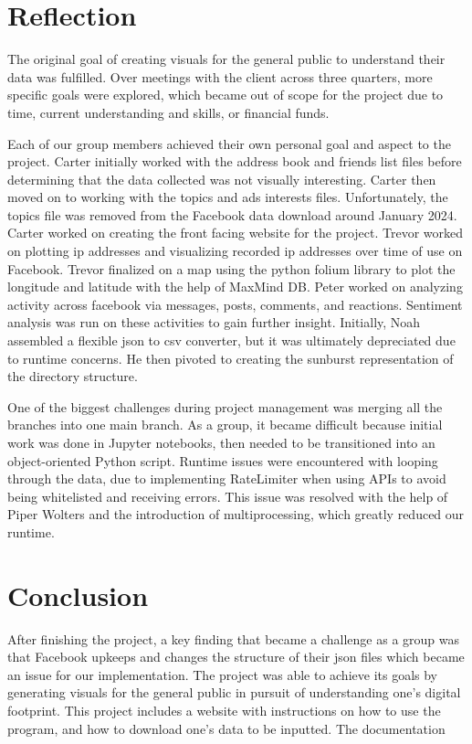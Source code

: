 \documentclass[conference, letterpaper, 11pt]{IEEEtran}
\begin{document}
\section{Reflection} \label{RE}
The original goal of creating visuals for the general public to understand their data was fulfilled. Over meetings with the client across three quarters, more specific goals were explored, which became out of scope for the project due to time, current understanding and skills, or financial funds.

Each of our group members achieved their own personal goal and aspect to the project. Carter initially worked with the address book and friends list files before determining that the data collected was not visually interesting. Carter then moved on to working with the topics and ads interests files. Unfortunately, the topics file was removed from the Facebook data download around January 2024. Carter worked on creating the front facing website for the project. Trevor worked on plotting ip addresses and visualizing recorded ip addresses over time of use on Facebook. Trevor finalized on a map using the python folium library to plot the longitude and latitude with the help of MaxMind DB. Peter worked on analyzing activity across facebook via messages, posts, comments, and reactions. Sentiment analysis was run on these activities to gain further insight. Initially, Noah assembled a flexible json to csv converter, but it was ultimately depreciated due to runtime concerns. He then pivoted to creating the sunburst representation of the directory structure.

One of the biggest challenges during project management was merging all the branches into one main branch. As a group, it became difficult because initial work was done in Jupyter notebooks, then needed to be transitioned into an object-oriented Python script. Runtime issues were encountered with looping through the data, due to implementing RateLimiter when using APIs to avoid being whitelisted and receiving errors. This issue was resolved with the help of Piper Wolters and the introduction of multiprocessing, which greatly reduced our runtime.

\section{Conclusion} \label{CO}
After finishing the project, a key finding that became a challenge as a group was that Facebook upkeeps and changes the structure of their json files which became an issue for our implementation. The project was able to achieve its goals by generating visuals for the general public in pursuit of understanding one's digital footprint. This project includes a website with instructions on how to use the program, and how to download one's data to be inputted. The documentation 
\end{document}
